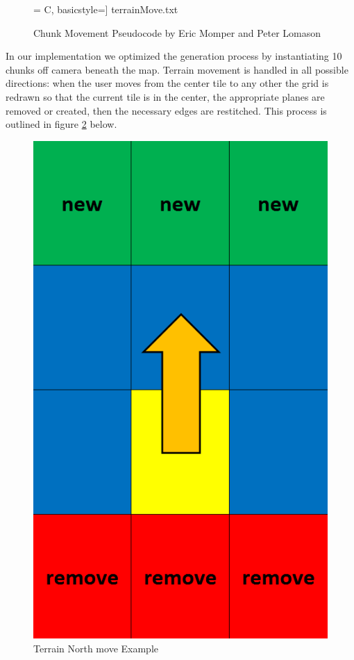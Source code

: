 \documentclass[a4paper,10pt]{article}
\begin{document}
	
\begin{figure}[H]
	\centerline{ = C, basicstyle=\small] {terrainMove.txt}}
	\caption{Chunk Movement Pseudocode by Eric Momper and Peter Lomason}
	\label{code:terrainMoveCode}
\end{figure}

\pagebreak
In our implementation we optimized the generation process by instantiating 10 chunks off camera beneath the map. Terrain movement is handled in all possible directions: when the user moves from the center tile to any other the grid is redrawn so that the current tile is in the center, the appropriate planes are removed or created, then the necessary edges are restitched. This process is outlined in figure \ref{fig:terrainMove} below.
 
\begin{figure}[H]
	\centerline{\includegraphics[scale=0.5,keepaspectratio]{terrainMove.png}}
	\caption{Terrain North move Example}
	\label{fig:terrainMove}
	\end{figure}
\end{document}

